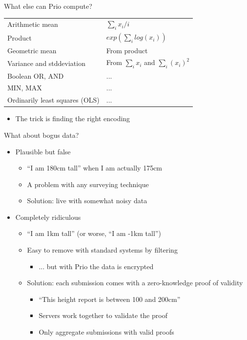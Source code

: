 \documentclass[helvetica]{beamer}
\begin{document}
\begin{frame}{What else can Prio compute?}

  \begin{tabular}{l l}
    Arithmetic mean & $\sum_i x_i / i$ \\
    Product & $exp(\sum_i log(x_i))$  \\
    Geometric mean & From product \\
    Variance and stddeviation & From $\sum_i x_i$ and $\sum_i (x_i)^2$ \\
    Boolean OR, AND & ... \\
    MIN, MAX & ... \\
    Ordinarily least squares (OLS) & ... \\
  \end{tabular}

  \vspace{2ex}
  \begin{itemize}
    \item[] The trick is finding the right encoding    
    \end{itemize}
\end{frame}

\begin{frame}{What about bogus data?}

  \begin{itemize}
  \item Plausible but false
    \begin{itemize}
    \item ``I am 180cm tall'' when I am actually 175cm
    \item A problem with any surveying technique
    \item Solution: live with somewhat noisy data
    \end{itemize}
  \item Completely ridiculous
    \begin{itemize}
    \item ``I am 1km tall'' (or worse, ``I am -1km tall'')
    \item Easy to remove with standard systems by filtering
      \begin{itemize}
      \item ... but with Prio the data is encrypted
      \end{itemize}
    \item Solution: each submission comes with a zero-knowledge proof of validity
    \begin{itemize}
      \item ``This height report is between 100 and 200cm''
      \item Servers work together to validate the proof
      \item Only aggregate submissions with valid proofs
      \end{itemize}
    \end{itemize}
  \end{itemize}
\end{frame}
\end{document}
